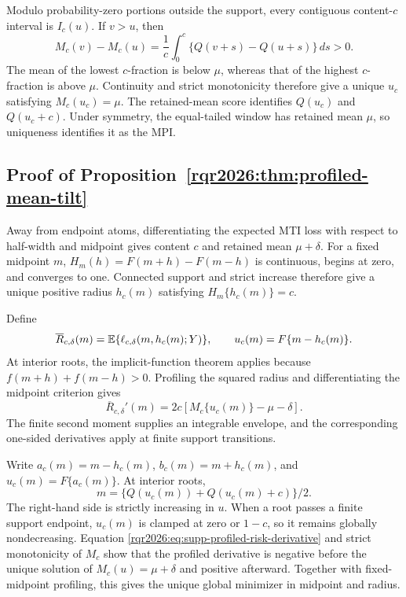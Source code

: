 Modulo probability-zero portions outside the support, every contiguous
content-\(c\) interval is \(I_c(u)\). If \(v>u\), then
\[
M_c(v)-M_c(u)
=\frac1c\int_0^c\{Q(v+s)-Q(u+s)\}\,ds>0.
\]
The mean of the lowest \(c\)-fraction is below \(\mu\), whereas that of the
highest \(c\)-fraction is above \(\mu\). Continuity and strict monotonicity
therefore give a unique \(u_c\) satisfying \(M_c(u_c)=\mu\). The retained-mean
score identifies \(Q(u_c)\) and \(Q(u_c+c)\). Under symmetry, the equal-tailed
window has retained mean \(\mu\), so uniqueness identifies it as the MPI.

\subsection{Proof of Proposition~\ref{rqr2026:thm:profiled-mean-tilt}}

Away from endpoint atoms, differentiating the expected MTI loss with respect
to half-width and midpoint gives content \(c\) and retained mean
\(\mu+\delta\). For a fixed midpoint \(m\),
\(H_m(h)=F(m+h)-F(m-h)\) is continuous, begins at zero, and converges to one.
Connected support and strict increase therefore give a unique positive radius
\(h_c(m)\) satisfying \(H_m\{h_c(m)\}=c\).

Define
\[
\overline R_{c,\delta}(m)
=\mathbb{E}\{\ell_{c,\delta}(m,h_c(m);Y)\},
\qquad
u_c(m)=F\{m-h_c(m)\}.
\]
At interior roots, the implicit-function theorem applies because
\(f(m+h)+f(m-h)>0\). Profiling the squared radius and differentiating the
midpoint criterion gives
\begin{equation}
\overline R_{c,\delta}'(m)
=2c[M_c\{u_c(m)\}-\mu-\delta].
\label{rqr2026:eq:supp-profiled-risk-derivative}
\end{equation}
The finite second moment supplies an integrable envelope, and the corresponding
one-sided derivatives apply at finite support transitions.

Write \(a_c(m)=m-h_c(m)\), \(b_c(m)=m+h_c(m)\), and
\(u_c(m)=F\{a_c(m)\}\). At interior roots,
\[
m=\{Q(u_c(m))+Q(u_c(m)+c)\}/2.
\]
The right-hand side is strictly increasing in \(u\). When a root passes a
finite support endpoint, \(u_c(m)\) is clamped at zero or \(1-c\), so it
remains globally nondecreasing. Equation
\eqref{rqr2026:eq:supp-profiled-risk-derivative} and strict monotonicity of \(M_c\)
show that the profiled derivative is negative before the unique solution of
\(M_c(u)=\mu+\delta\) and positive afterward. Together with fixed-midpoint
profiling, this gives the unique global minimizer in midpoint and radius.


